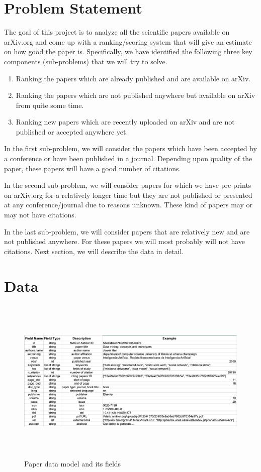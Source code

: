 \documentclass[a4paper, 11pt]{article}
\begin{document}
\section{Problem Statement}
The goal of this project is to analyze all the scientific papers available on arXiv.org and come up with a ranking/scoring system that will give an estimate on how good the paper is. Specifically, we have identified the following three key components (sub-problems) that we will try to solve.
\begin{enumerate}
\item Ranking the papers which are already published and are available on arXiv.
\item Ranking the papers which are not published anywhere but available on arXiv from quite some time.
\item Ranking new papers which are recently uploaded on arXiv and are not published or accepted anywhere yet.
\end{enumerate}

In the first sub-problem, we will consider the papers which have been accepted by a conference or have been published in a journal. Depending upon quality of the paper, these papers will have a good number of citations. 

In the second sub-problem, we will consider papers for which we have pre-prints on arXiv.org for a relatively longer time but they are not published or presented at any conference/journal due to reasons unknown. These kind of papers may or may not have citations.

In the last sub-problem, we will consider papers that are relatively new and are not published anywhere. For these papers we will most probably will not have citations. Next section, we will describe the data in detail.

\section{Data}

\begin{figure}[h]
    \centering
    \includegraphics[width=17cm,height=8cm]{datamodel_new}
    \caption{Paper data model and its fields \cite{data}}
    \label{fig:datamodel}
\end{figure}
\end{document}
